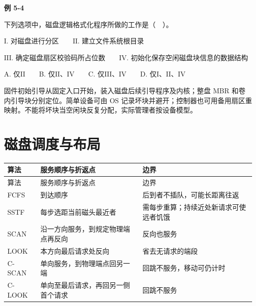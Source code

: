 \par\medskip{}\noindent\hypertarget{OS05-E04}{}\label{OS05-E04}\textbf{例 5-4}\par\nobreak\smallskip

下列选项中，磁盘逻辑格式化程序所做的工作是（　）。

\ensuremath{\mathrm{I}}. 对磁盘进行分区　　\ensuremath{\mathrm{II}}. 建立文件系统根目录

\ensuremath{\mathrm{III}}. 确定磁盘扇区校验码所占位数　　\ensuremath{\mathrm{IV}}. 初始化保存空闲磁盘块信息的数据结构

A. 仅\ensuremath{\mathrm{II}}　　B. 仅\ensuremath{\mathrm{II}}、\ensuremath{\mathrm{IV}}　　C. 仅\ensuremath{\mathrm{III}}、\ensuremath{\mathrm{IV}}　　D. 仅\ensuremath{\mathrm{I}}、\ensuremath{\mathrm{II}}、\ensuremath{\mathrm{IV}}

固件初始引导从固定入口开始，装入磁盘后续引导程序及内核；整盘 MBR 和卷内引导块分别定位。简单设备可由 OS 记录坏块并避开；控制器也可用备用扇区重映射。不能将坏块当空闲块反复分配，实际管理者按设备模型。

\section{磁盘调度与布局}\label{OS05-disk-scheduling}

\par\smallskip
\begin{wideblock}
{\fontsize{9.3}{12}\selectfont\setlength{\tabcolsep}{2.5pt}\setlength{\LTleft}{0pt}\setlength{\LTright}{0pt}
\begin{longtable}{@{}>{\raggedright\arraybackslash}p{}>{\raggedright\arraybackslash}p{}>{\raggedright\arraybackslash}p{}@{}}
\toprule
算法 & 服务顺序与折返点 & 边界 \\

\midrule\endfirsthead\toprule
算法 & 服务顺序与折返点 & 边界 \\

\midrule\endhead\bottomrule\endfoot
FCFS & 到达顺序 & 后到者不插队，可能长距离往返 \\

SSTF & 每步选距当前磁头最近者 & 需每步重算；持续近处新请求可使远者饥饿 \\

SCAN & 沿一方向服务，到规定物理端点再反向 & 反向也服务 \\

LOOK & 本方向最后请求处反向 & 省去无请求的端段 \\

C-SCAN & 单向服务，到物理端点回另一端 & 回跳不服务，移动可仍计时 \\

C-LOOK & 单向至最后请求，再回另一侧首个请求 & 回跳不服务 \\

\end{longtable}}
\end{wideblock}
\par\smallskip

